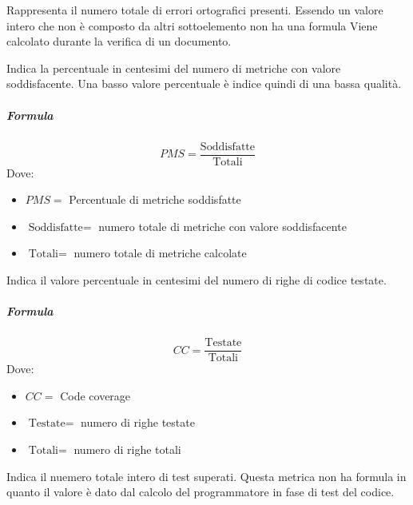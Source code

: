         Rappresenta il numero totale di errori ortografici presenti. Essendo un valore intero che non è composto da altri sottoelemento non ha una formula
        Viene calcolato durante la verifica di un documento.
        
        Indica la percentuale in centesimi del numero di metriche con valore soddisfacente. Una basso valore percentuale è indice quindi di una bassa qualità.
        \subparagraph{Formula}
        \begin{displaymath}
          PMS = \frac{\textrm{Soddisfatte}}{\textrm{Totali}}
        \end{displaymath}
        Dove:
        \begin{itemize}
        \item[] $PMS =$ Percentuale di metriche soddisfatte
        \item[] $\textrm{Soddisfatte} =$ numero totale di metriche con valore soddisfacente
        \item[] $\textrm{Totali} =$ numero totale di metriche calcolate
        \end{itemize}
        
        Indica il valore percentuale in centesimi del numero di righe di codice testate.
        \subparagraph{Formula}
        \begin{displaymath}
          CC = \frac{\textrm{Testate}}{\textrm{Totali}}
        \end{displaymath}
        Dove:
        \begin{itemize}
        \item[] $CC =$ Code coverage
        \item[] $\textrm{Testate} =$ numero di righe testate
        \item[] $\textrm{Totali} =$ numero di righe totali
        \end{itemize}
        
        
        Indica il nuemero totale intero di test superati. Questa metrica non ha formula in quanto il valore è dato dal calcolo del programmatore in fase di test del codice.
